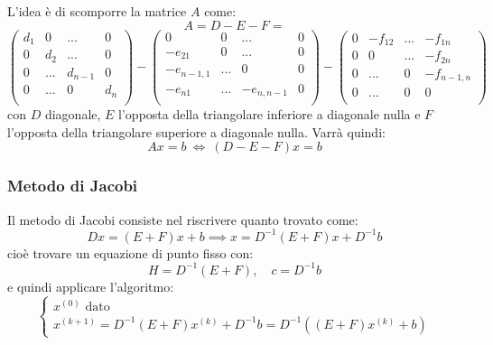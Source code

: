 \documentclass[a4paper,11pt]{article}
\begin{document}
L'idea è di scomporre la matrice $A$ come:
$$
A = D - E - F =
$$
$$
\begin{pmatrix}
	d_1 & 0 & ... & 0 \\
	0 & d_2 & ... & 0 \\
	0 & ... & d_{n-1} & 0 \\
	0 & ... & 0 & d_n \\
\end{pmatrix}
-
\begin{pmatrix}
	0 & 0 & ... & 0 \\
	-e_{21} & 0 & ... & 0 \\
	-e_{n-1,1} & ... & 0 & 0 \\
	-e_{n1} & ... & -e_{n, n-1} & 0 \\
\end{pmatrix}
-
\begin{pmatrix}
	0 & -f_{12} & ... & -f_{1n} \\
	0 & 0 & ... & -f_{2n} \\
	0 & ... & 0 & -f_{n-1, n} \\
	0 & ... & 0 & 0 \\
\end{pmatrix}
$$
con $D$ diagonale, $E$ l'opposta della triangolare inferiore a diagonale nulla e $F$ l'opposta della triangolare superiore a diagonale nulla.
Varrà quindi:
$$
Ax = b \ \Leftrightarrow \ (D - E - F) x = b
$$

\subsubsection{Metodo di Jacobi}
Il metodo di Jacobi consiste nel riscrivere quanto trovato come:
$$
D x = (E + F) x + b \implies x = D^{-1} (E + F) x + D^{-1} b
$$
cioè trovare un equazione di punto fisso con:
$$
H = D^{-1} (E + F), \quad c = D^{-1} b
$$
e quindi applicare l'algoritmo:\[
	\begin{cases}
		x^{(0)} \text{ dato} \\
		x^{(k + 1)} = D^{-1} (E + F) x^{(k)} + D^{-1} b = D^{-1} ( (E + F) x^{(k)} + b )
	\end{cases}
\]
\end{document}
